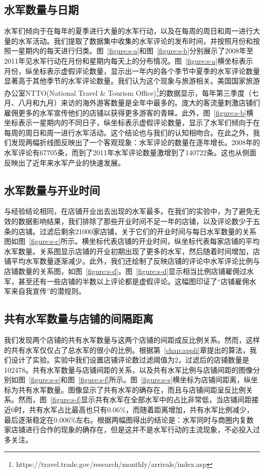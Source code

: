\subsection{水军数量与日期}

水军们倾向于在每年的夏季进行大量的水军行动，以及在每周的周日和周一进行大量的水军活动。我们提取了数据集中收集的水军评论的发布时间，并按照月份和按照一星期内的每天进行归类。图~\ref{figure:s-a}和图~\ref{figure:s-b}分别展示了2008年至2011年见水军行动在月份和星期内每天上的分布情况。图~\ref{figure:s-a}横坐标表示月份，纵坐标表示虚假评论数量，显示出一年内的各个季节中夏季的水军评论数量显著高于其他季节的水军评论数量。我们认为这个现象与旅游相关。美国国家旅游办公室NTTO(National Travel \& Tourism Office)\footnote{https://travel.trade.gov/research/monthly/arrivals/index.asp}的数据显示，每年第三季度（七月、八月和九月）来访的海外游客数量是全年中最多的。庞大的客流量刺激店铺们雇佣更多的水军宣传他们的店铺以获得更多游客的青睐。此外，图~\ref{figure:s-b}横坐标表示一星期内的不同日子，纵坐标表示虚假评论数量，显示了水军们倾向于在每周的周日和周一进行水军活动。这个结论也与我们的认知相吻合。在此之外，我们发现两幅折线图反映出了一个客观现象：水军评论的数量在逐年增长。2008年的水军评论有67705条，而到了2011年水军评论数量激增到了140722条。这也从侧面反映出了近年来水军产业的快速发展。



\subsection{水军数量与开业时间}

与经验结论相同，在店铺开业出去出现的水军最多。在我们的实验中，为了避免无效的数据影响结果，我们排除了那些开业时间不足一年的店铺，以及评论数少于五条的店铺。过滤后剩余21000家店铺，关于它们的开业时间与每日水军数量的关系图如图~\ref{figure:s-c}所示。横坐标代表店铺的开业时间，纵坐标代表每家店铺的平均水军数量。关系图显示店铺的开业初期出现了更多的水军，然后随着时间增加，店铺平均水军数量逐渐减少。此外，我们还绘制了反映店铺的评论中水军评论比例与店铺数量的关系图，如图~\ref{figure:s-d}。图~\ref{figure:s-d}显示相当比例店铺雇佣过水军，甚至还有一些店铺的半数以上评论都是虚假评论。这幅图印证了“店铺雇佣水军来自我宣传”的潜规则。


\subsection{共有水军数量与店铺的间隔距离}

我们发现两个店铺的共有水军数量与这两个店铺的间距成反比例关系。然而，这样的共有水军仅仅占了总水军的很小的比例。根据第~\ref{chap:appli}章提出的算法，我们设计了实验。实验中我们设置店铺评论数过滤阈值为2，过滤后的店铺数量是102478。共有水军数量与店铺间距的关系，以及共有水军比例与店铺间距的图像分别如图~\ref{figure:s-e}和图~\ref{figure:s-f}所示。图~\ref{figure:s-e}横坐标为店铺间距离，纵坐标为共有水军数量。图像显示了共有水军的确存在，而且与店铺间距呈反比例关系。然而，图~\ref{figure:s-f}显示共有水军在全部水军中的占比非常低，当店铺间距接近0时，共有水军占比最高也只有0.06\%，而随着距离增加，共有水军比例减少，最后逐渐稳定在0.006\%左右。根据两幅图得出的结论是：水军同时与商圈内复数家店铺进行合作的现象的确存在，但是这并不是水军行动的主流现象，不必投入过多关注。



